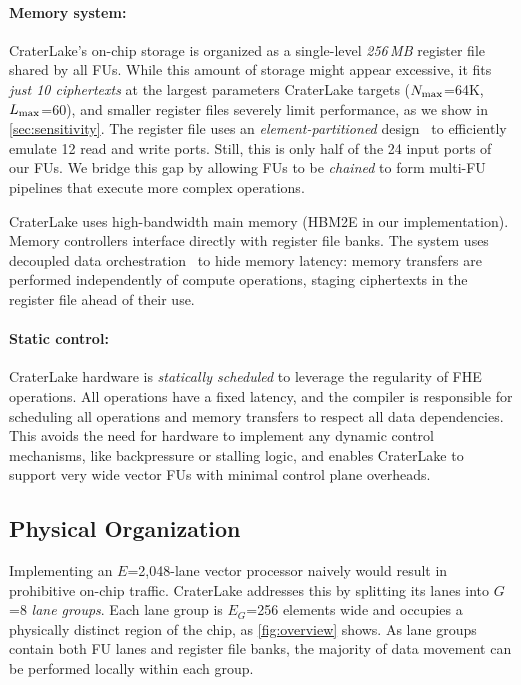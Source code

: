\paragraph{Memory system:} CraterLake's on-chip storage is organized as a
single-level \emph{256\,MB} register file shared by all FUs. While this amount
of storage might appear excessive, it fits \emph{just 10 ciphertexts} at the
largest parameters CraterLake targets ($N_{\textrm{max}}$=64K, $L_{\textrm{max}}$=60), and smaller
register files severely limit performance, as we show in
\autoref{sec:sensitivity}. The register file uses an \emph{element-partitioned}
design~\cite{asanovic:ucb98:vector} to efficiently emulate 12 read and write
ports. Still, this is only half of the 24 input ports of our FUs.
We bridge this gap by allowing FUs to be \emph{chained} to form multi-FU
pipelines that execute more complex operations.

CraterLake uses high-bandwidth main memory (HBM2E in our implementation). Memory
controllers interface directly with register file banks. The system uses
decoupled data orchestration~\cite{pellauer:asplos19:buffets} to hide memory
latency: memory transfers are performed independently of compute operations,
staging ciphertexts in the register file ahead of their use.


\paragraph{Static control:} CraterLake hardware is \emph{statically scheduled} to
leverage the regularity of FHE operations. All operations have a fixed latency,
and the compiler is responsible for scheduling all operations and memory
transfers to respect all data dependencies. This avoids the need for hardware
to implement any dynamic control mechanisms, like backpressure or stalling
logic, and enables CraterLake to support very wide vector FUs with minimal control
plane overheads.

\subsection{Physical Organization} \label{sec:tiling} Implementing an
$E$=2,048-lane vector processor naively would result in prohibitive on-chip
traffic. CraterLake addresses this by splitting its lanes into $G$=8 \emph{lane
groups}. Each lane group is $E_G$=256 elements wide and occupies a physically
distinct region of the chip, as \autoref{fig:overview} shows. As lane groups
contain both FU lanes and register file banks, the majority of data movement
can be performed locally within each group.

